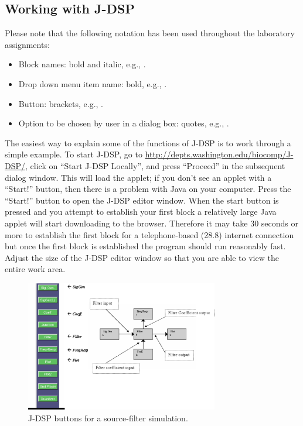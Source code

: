 \subsection{Working with J-DSP}

Please note that the following notation has been used throughout the
laboratory assignments:
\begin{itemize}
\item Block names: bold and italic, e.g., .
\item Drop down menu item name: bold, e.g., .
\item Button: brackets, e.g., .
\item Option to be chosen by user in a dialog box: quotes, e.g.,
  .
\end{itemize}

The easiest way to explain some of the functions of J-DSP is to work
through a simple example. To start J-DSP, go to
\href{http://depts.washington.edu/biocomp/J-DSP/}{http://depts.washington.edu/biocomp/J-DSP/},
click on ``Start J-DSP Locally'', and press ``Proceed'' in the
subsequent dialog window. This will load the applet; if you don't see
an applet with a ``Start!'' button, then there is a problem with Java
on your computer. Press the ``Start!'' button to open the J-DSP editor
window. When the start button is pressed and you attempt to establish
your first block a relatively large Java applet will start downloading
to the browser. Therefore it may take 30 seconds or more to establish
the first block for a telephone-based (28.8) internet connection but
once the first block is established the program should run reasonably
fast. Adjust the size of the J-DSP editor window so that you are able
to view the entire work area.

\begin{figure}
\begin{center}
\includegraphics[width=0.75\textwidth]{lab1/buttons}
\end{center}
\caption{J-DSP buttons for a source-filter simulation.\label{fg:buttons}}
\end{figure}

